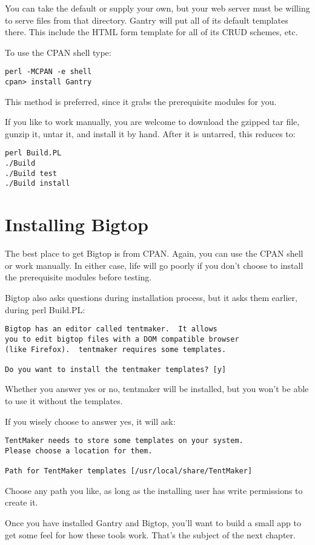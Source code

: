 You can take the default or supply your own, but your web server must be
willing to serve files from that directory.  Gantry will put all of its
default templates there.  This include the HTML form template for all of
its CRUD schemes, etc.

To use the CPAN shell type:

\begin{verbatim}
perl -MCPAN -e shell
cpan> install Gantry
\end{verbatim}

This method is preferred, since it grabs the prerequisite modules for you.

If you like to work manually, you are welcome to download the gzipped tar
file, gunzip it, untar it, and install it by hand.  After it is untarred,
this reduces to:

\begin{verbatim}
perl Build.PL
./Build
./Build test
./Build install
\end{verbatim}

\section{Installing Bigtop}

The best place to get Bigtop is from CPAN.  Again, you can use the
CPAN shell or work manually.  In either case, life will go poorly if you
don't choose to install the prerequisite modules before testing.

Bigtop also asks questions during installation process, but it asks them
earlier, during perl Build.PL:

\begin{verbatim}
Bigtop has an editor called tentmaker.  It allows
you to edit bigtop files with a DOM compatible browser
(like Firefox).  tentmaker requires some templates.

Do you want to install the tentmaker templates? [y]
\end{verbatim}

Whether you answer yes or no, tentmaker will be installed, but you won't be
able to use it without the templates.

If you wisely choose to answer yes, it will ask:

\begin{verbatim}
TentMaker needs to store some templates on your system.
Please choose a location for them.

Path for TentMaker templates [/usr/local/share/TentMaker]
\end{verbatim}

Choose any path you like, as long as the installing user has write permissions
to create it.

Once you have installed Gantry and Bigtop, you'll want to build a small app
to get some feel for how these tools work.  That's the subject of the next
chapter.
